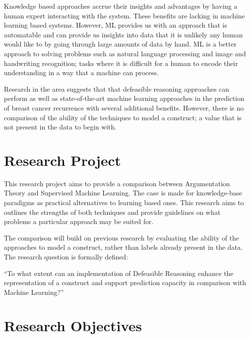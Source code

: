 Knowledge based approaches accrue their insights and advantages by having a human expert interacting with the system. These benefits are lacking in machine learning based systems. However, ML provides us with an approach that is automatable and can provide us insights into data that it is unlikely any human would like to by going through large amounts of data by hand. ML is a better approach to solving problems such as natural language processing and image and handwriting recognition; tasks where it is difficult for a human to encode their understanding in a way that a machine can process.

Research in the area suggests that that defeasible reasoning approaches can perform as well as state-of-the-art machine learning approaches in the prediction of breast cancer recurrence with several additional benefits. However, there is no comparison of the ability of the techniques to model a construct; a value that is not present in the data to begin with.


\section{Research Project}


This research project aims to provide a comparison between Argumentation Theory and Supervised Machine Learning. The case is made for knowledge-base paradigms as practical alternatives to learning based ones. This research aims to outlines the strengths of both techniques and provide guidelines on what problems a particular approach may be suited for. 

The comparison will build on previous research by evaluating the ability of the approaches to model a construct, rather than labels already present in the data. The research question is formally defined:

``To what extent can an implementation of Defeasible Reasoning enhance the representation of a construct and support prediction capacity in comparison with Machine Learning?''



\section{Research Objectives}


